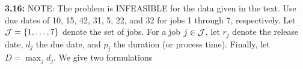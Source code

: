 \documentclass[10pt]{article}
\begin{document}

\noindent \textbf{3.16:} NOTE:  The problem is INFEASIBLE for the data given in the text.  Use due dates of 10, 15, 42, 31, 5, 22, and 32 for jobs 1 through 7, respectively.  Let ${\cal J} = \{1,\ldots,7\}$ denote the set of jobs. For a job $j \in {\cal J}$, let $r_j$ denote the release date, $d_j$ the due date, and $p_j$ the duration (or process
  time).  Finally, let $D = \max_{j} d_j$. We give two formulations
\end{document}

